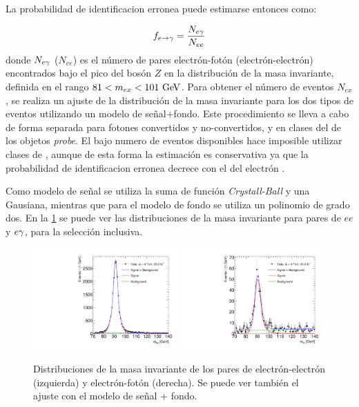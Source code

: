 La probabilidad de identificacion erronea {\feg} puede estimarse entonces como:

\begin{equation}\label{eq:efakerate}
  f_{e\rightarrow\gamma} = \frac{N_{e\gamma}}{N_{ee}}
\end{equation}
%
donde $N_{e\gamma}$ ($N_{ee}$) es el número de pares electrón-fotón
(electrón-electrón) encontrados bajo el pico del bosón $Z$ en la distribución de
la masa invariante, definida en el rango $81 < m_{ex} < 101 \gev$. Para obtener
el número de eventos $N_{ex}$, se realiza un ajuste de la distribución de la
masa invariante para los dos tipos de eventos utilizando un modelo de
señal+fondo. Este procedimiento se lleva a cabo de forma separada para fotones
convertidos y no-convertidos, y en clases del {\abseta} de los objetos
\emph{probe}. El bajo numero de eventos disponibles hace imposible utilizar
clases de {\pt}, aunque de esta forma la estimación es conservativa ya que la
probabilidad de identificacion erronea decrece con el {\pt} del electrón
\cite{Kuhl:1604846}.

Como modelo de señal se utiliza la suma de función \emph{Crystall-Ball} y una
Gausiana, mientras que para el modelo de fondo se utiliza un polinomio de grado
dos. En la \cref{fig:invmass_pairs} se puede ver las distribuciones de la masa
invariante para pares de $ee$ y $e\gamma$, para la selección inclusiva.

\begin{figure}[!htbp]
  \centering

  \includegraphics[width=0.49\textwidth]{figures/Fit_mee_efakes_Data_all}
  \includegraphics[width=0.49\textwidth]{figures/Fit_meg_efakes_Data_all}
  \caption{Distribuciones de la masa invariante de los pares de
    electrón-electrón (izquierda) y electrón-fotón (derecha). Se puede ver también el ajuste
    con el modelo de señal + fondo.}
  \label{fig:invmass_pairs}

\end{figure}

